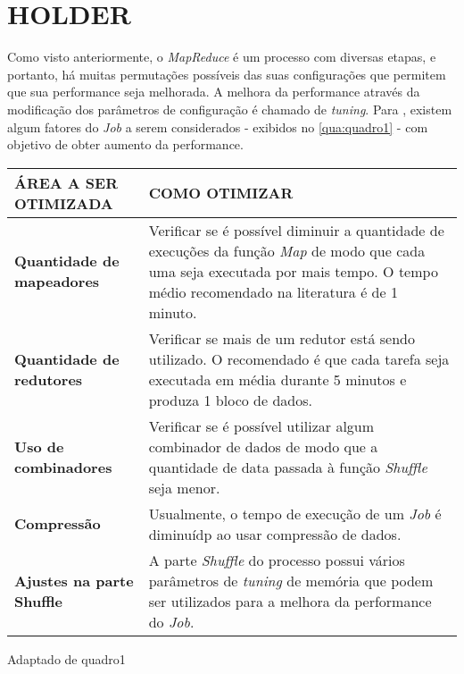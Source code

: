 \chapter{HOLDER} \label{cha:holder}

Como visto anteriormente, o \textit{MapReduce} é um processo com diversas etapas, e portanto, há muitas permutações possíveis das suas configurações que permitem que sua performance seja melhorada. A melhora da performance através da modificação dos parâmetros de configuração é chamado de \textit{tuning}. Para \textcite{HadoopBook15}, existem algum fatores do \textit{Job} a serem considerados - exibidos no \autoref{qua:quadro1} - com objetivo de obter aumento da performance.

{\footnotesize
  \centering
  \begin{tabular}{|p{50mm}|p{100mm}|}\hline
    \textbf{ÁREA A SER OTIMIZADA}     & \textbf{COMO OTIMIZAR}                                                                                                                                                                       \\\hline
    \textbf{Quantidade de mapeadores} & Verificar se é possível diminuir a quantidade de execuções da função \textit{Map} de modo que cada uma seja executada por mais tempo. O tempo médio recomendado na literatura é de 1 minuto. \\\hline
    \textbf{Quantidade de redutores}  & Verificar se mais de um redutor está sendo utilizado. O recomendado é que cada tarefa seja executada em média durante 5 minutos e produza 1 bloco de dados.                                  \\\hline
    \textbf{Uso de combinadores}      & Verificar se é possível utilizar algum combinador de dados de modo que a quantidade de data passada à função \textit{Shuffle} seja menor.                                                    \\\hline
    \textbf{Compressão}               & Usualmente, o tempo de execução de um \textit{Job} é diminuídp ao usar compressão de dados.                                                                                                  \\\hline
    \textbf{Ajustes na parte Shuffle} & A parte \textit{Shuffle} do processo possui vários parâmetros de \textit{tuning} de memória que podem ser utilizados para a melhora da performance do \textit{Job}.                          \\\hline
  \end{tabular}}
{Adaptado de \cite{HadoopBook15}}{quadro1}{}{}

